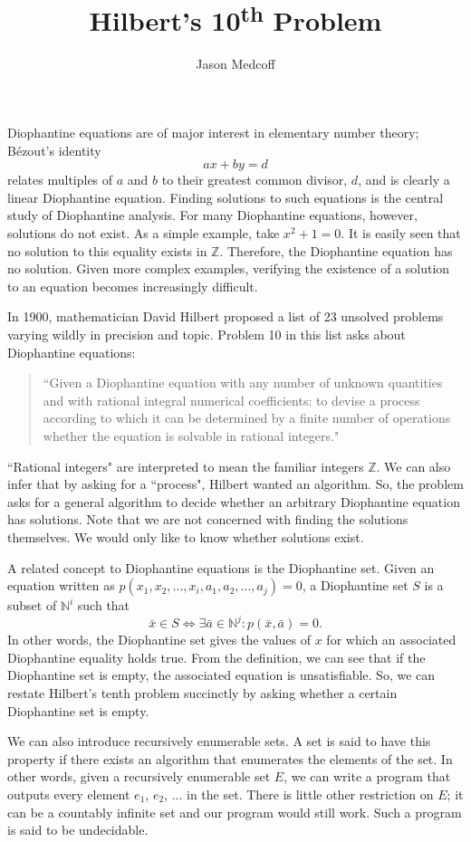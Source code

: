 \documentclass[12pt]{amsart}
\title{Hilbert's 10\textsuperscript{th} Problem}
\author{Jason Medcoff}
\theoremstyle{case}
\begin{document}
	
	\maketitle
	
	Diophantine equations are of major interest in elementary number theory; B\'{e}zout's identity
	$$ ax + by = d $$
	relates multiples of $a$ and $b$ to their greatest common divisor, $d$, and is clearly a linear Diophantine equation. Finding solutions to such equations is the central study of Diophantine analysis. For many Diophantine equations, however, solutions do not exist. As a simple example, take $x^2 + 1 = 0$. It is easily seen that no solution to this equality exists in $\mathbb{Z}$. Therefore, the Diophantine equation has no solution. Given more complex examples, verifying the existence of a solution to an equation becomes increasingly difficult.
	
	In 1900, mathematician David Hilbert proposed a list of 23 unsolved problems varying wildly in precision and topic. Problem 10 in this list asks about Diophantine equations:
	\begin{quotation}
		``Given a Diophantine equation with any number of unknown quantities and with rational integral numerical coefficients: to devise a process according to which it can be determined by a finite number of operations whether the equation is solvable in rational integers."
	\end{quotation}
	``Rational integers" are interpreted to mean the familiar integers $\mathbb{Z}$. We can also infer that by asking for a ``process", Hilbert wanted an algorithm. So, the problem asks for a general algorithm to decide whether an arbitrary Diophantine equation has solutions. Note that we are not concerned with finding the solutions themselves. We would only like to know whether solutions exist.
	
	A related concept to Diophantine equations is the Diophantine set. Given an equation written as $p(x_1,x_2,...,x_i,a_1,a_2,...,a_j)=0$, a Diophantine set $S$ is a subset of $\mathbb{N}^i$ such that
	$$ \bar{x} \in S \iff \exists \bar{a} \in \mathbb{N}^j : p(\bar{x}, \bar{a}) = 0 . $$
	In other words, the Diophantine set gives the values of $x$ for which an associated Diophantine equality holds true. From the definition, we can see that if the Diophantine set is empty, the associated equation is unsatisfiable. So, we can restate Hilbert's tenth problem succinctly by asking whether a certain Diophantine set is empty.
	
	We can also introduce recursively enumerable sets. A set is said to have this property if there exists an algorithm that enumerates the elements of the set. In other words, given a recursively enumerable set $E$, we can write a program that outputs every element $e_1$, $e_2$, ... in the set. There is little other restriction on $E$; it can be a countably infinite set and our program would still work. Such a program is said to be undecidable.
	
\end{document}
